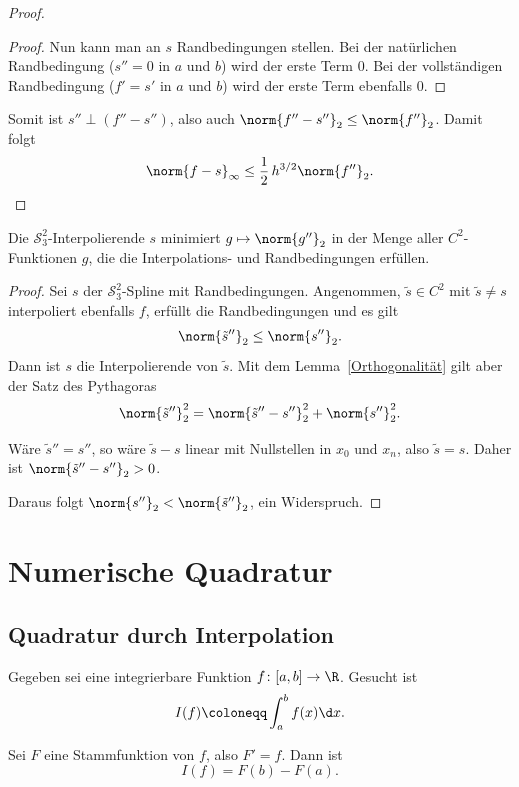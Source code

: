 \documentclass[11pt]{article}
\begin{document}
\begin{proof}
\begin{proof}
    Nun kann man an $s$ Randbedingungen stellen. Bei der natürlichen Randbedingung ($s'' = 0$ in $a$ und $b$) wird der erste Term $0$. Bei der vollständigen Randbedingung ($f' = s'$ in $a$ und $b$) wird der erste Term ebenfalls $0$.
  \end{proof}

  Somit ist $s'' \perp (f'' - s'')$, also auch $\norm{f'' - s''}_2 \le \norm{f''}_2$. Damit folgt
  \[ \norm{f - s}_\infty \le \frac{1}{2}\, h^{3/2} \norm{f''}_2. \qedhere \]
\end{proof}

\begin{theorem}[Minimaleigenschaft]\Theorem
  Die $\mathcal{S}_3^2$-Interpolierende $s$ minimiert $g \mapsto \norm{g''}_2$ in der Menge aller $C^2$-Funktionen $g$, die die Interpolations- und Randbedingungen erfüllen.
\end{theorem}


\begin{proof}
  Sei $s$ der $\mathcal{S}_3^2$-Spline mit Randbedingungen. Angenommen, $\tilde{s} \in C^2$ mit $\tilde{s} \neq s$ interpoliert ebenfalls $f$, erfüllt die Randbedingungen und es gilt
  \[ \norm{\tilde{s}''}_2 \le \norm{s''}_2. \]
  Dann ist $s$ die Interpolierende von $\tilde{s}$. Mit dem Lemma~\ref{Orthogonalität} gilt aber der Satz des Pythagoras
  \[ \norm{\tilde{s}''}_2^2 = \norm{\tilde{s}'' - s''}_2^2 + \norm{s''}_2^2. \]
\begin{ergaenzung}
  Wäre $\tilde{s}'' = s''$, so wäre $\tilde{s} - s$ linear mit Nullstellen in $x_0$ und $x_n$, also $\tilde{s} = s$. Daher ist $\norm{\tilde{s}'' - s''}_2 > 0$.
  \end{ergaenzung}
  Daraus folgt $\norm{s''}_2 < \norm{\tilde{s}''}_2$, ein Widerspruch.
\end{proof}


\section{Numerische Quadratur}


\subsection{Quadratur durch Interpolation}

Gegeben sei eine integrierbare Funktion $f\colon [a, b] \to \R$. Gesucht ist
\[ I(f) \coloneqq \int_a^b f(x) \d x. \]

\begin{theorem}[Fundamentalsatz]\Theorem
  Sei $F$ eine Stammfunktion von $f$, also $F' = f$. Dann ist
  \[ I(f) = F(b) - F(a). \]
\end{theorem}
\end{document}
